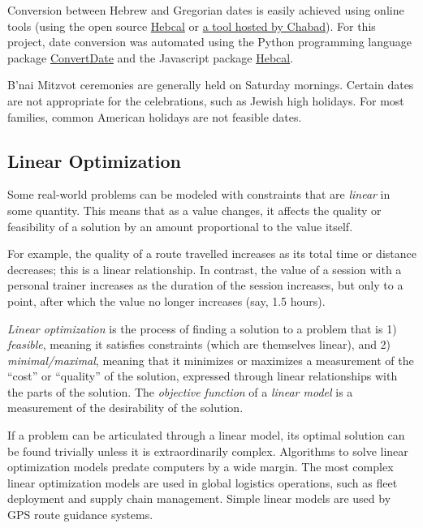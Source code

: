 \documentclass[11pt]{article}
\begin{document}
Conversion between Hebrew and Gregorian dates is easily achieved using online tools (using the open source \href{https://www.hebcal.com/converter/}{Hebcal} or \href{https://www.chabad.org/calendar/1000year_cdo/aid/6225/jewish/Jewish-Hebrew-Date-Converter.htm}{a tool hosted by Chabad}). For this project, date conversion was automated using the Python programming language package \href{https://pypi.org/project/convertdate/}{ConvertDate} and the Javascript package \href{https://github.com/hebcal/hebcal-js}{Hebcal}.

B'nai Mitzvot ceremonies are generally held on Saturday mornings. Certain dates are not appropriate for the celebrations, such as Jewish high holidays. For most families, common American holidays are not feasible dates.



\subsection{Linear Optimization}

Some real-world problems can be modeled with constraints that are \emph{linear} in some quantity. This means that as a value changes, it affects the quality or feasibility of a solution by an amount proportional to the value itself.

For example, the quality of a route travelled increases as its total time or distance decreases; this is a linear relationship. In contrast, the value of a session with a personal trainer increases as the duration of the session increases, but only to a point, after which the value no longer increases (say, 1.5 hours).

\emph{Linear optimization} is the process of finding a solution to a problem that is 1) \emph{feasible}, meaning it satisfies constraints (which are themselves linear), and 2) \emph{minimal/maximal}, meaning that it minimizes or maximizes a measurement of the ``cost'' or ``quality'' of the solution, expressed through linear relationships with the parts of the solution. The \emph{objective function} of a \emph{linear model} is a measurement of the desirability of the solution.

If a problem can be articulated through a linear model, its optimal solution can be found trivially unless it is extraordinarily complex. Algorithms to solve linear optimization models predate computers by a wide margin. The most complex linear optimization models are used in global logistics operations, such as fleet deployment and supply chain management. Simple linear models are used by GPS route guidance systems.
\end{document}
